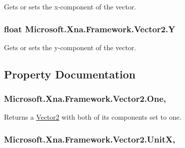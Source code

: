 Gets or sets the x-\/component of the vector.

\hypertarget{struct_microsoft_1_1_xna_1_1_framework_1_1_vector2_adb6b2d6af0cc594ae0f8e0b312663ef5}{}
\subsubsection[{Y}]{\setlength{\rightskip}{0pt plus 5cm}float Microsoft.\+Xna.\+Framework.\+Vector2.\+Y}\label{struct_microsoft_1_1_xna_1_1_framework_1_1_vector2_adb6b2d6af0cc594ae0f8e0b312663ef5}


Gets or sets the y-\/component of the vector.



\subsection{Property Documentation}
\hypertarget{struct_microsoft_1_1_xna_1_1_framework_1_1_vector2_a81e3bdd813a766ad2a1e14c96c8cfa3b}{}
\subsubsection[{One}]{ Microsoft.\+Xna.\+Framework.\+Vector2.\+One\hspace{0.3cm}{\ttfamily [static]}, {\ttfamily [get]}}\label{struct_microsoft_1_1_xna_1_1_framework_1_1_vector2_a81e3bdd813a766ad2a1e14c96c8cfa3b}


Returns a \hyperlink{struct_microsoft_1_1_xna_1_1_framework_1_1_vector2}{Vector2} with both of its components set to one.

\hypertarget{struct_microsoft_1_1_xna_1_1_framework_1_1_vector2_a7884d5af8934eebc91a118a381b0ec25}{}
\subsubsection[{Unit\+X}]{ Microsoft.\+Xna.\+Framework.\+Vector2.\+Unit\+X\hspace{0.3cm}{\ttfamily [static]}, {\ttfamily [get]}}\label{struct_microsoft_1_1_xna_1_1_framework_1_1_vector2_a7884d5af8934eebc91a118a381b0ec25}


